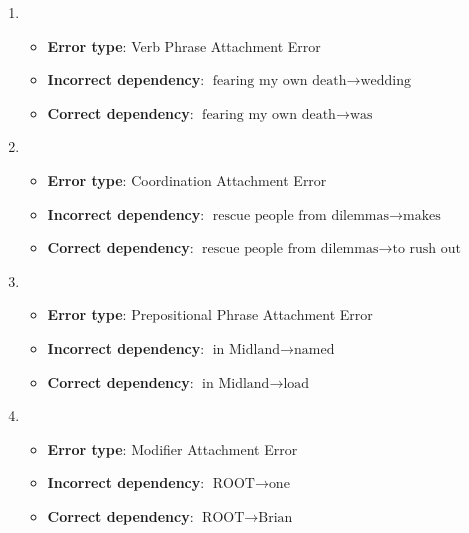 \documentclass{article}
\begin{document}
\begin{enumerate}[leftmargin=0pt,listparindent=0pt]
\begin{enumerate}[leftmargin=0pt,listparindent=0pt]
\begin{enumerate}[leftmargin=0pt,listparindent=0pt]

\item 

\begin{itemize}
\item \textbf{Error type}: Verb Phrase Attachment Error
\item \textbf{Incorrect dependency}: $\text{fearing my own death} \rightarrow \text{wedding}$
\item \textbf{Correct dependency}: $\text{fearing my own death} \rightarrow \text{was}$
\end{itemize}

\item 

\begin{itemize}
\item \textbf{Error type}: Coordination Attachment Error
\item \textbf{Incorrect dependency}: $\text{rescue people from dilemmas} \rightarrow \text{makes}$
\item \textbf{Correct dependency}: $\text{rescue people from dilemmas} \rightarrow \text{to rush out}$
\end{itemize}

\item 

\begin{itemize}
\item \textbf{Error type}: Prepositional Phrase Attachment Error
\item \textbf{Incorrect dependency}: $\text{in Midland} \rightarrow \text{named}$
\item \textbf{Correct dependency}: $\text{in Midland} \rightarrow \text{load}$
\end{itemize}

\item 

\begin{itemize}
\item \textbf{Error type}: Modifier Attachment Error
\item \textbf{Incorrect dependency}: $\text{ROOT} \rightarrow \text{one}$
\item \textbf{Correct dependency}: $\text{ROOT} \rightarrow \text{Brian}$
\end{itemize}

\end{enumerate}

\end{enumerate}

\end{enumerate}
\end{document}

